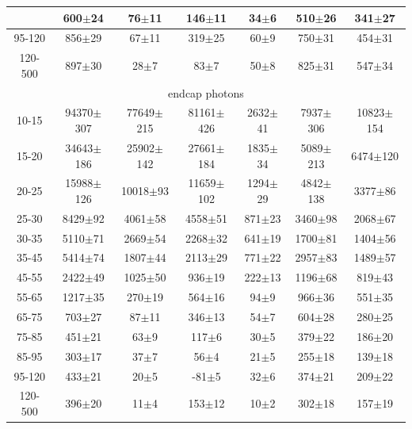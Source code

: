 \begin{table}[h]
\begin{center}
\begin{tabular}{|c|c|c|c|c|c|c|}
{85-95 & 600$\pm$24 & 76$\pm$11 & 146$\pm$11 & 34$\pm$6 & 510$\pm$26 & 341$\pm$27 \\ \hline 
95-120 & 856$\pm$29 & 67$\pm$11 & 319$\pm$25 & 60$\pm$9 & 750$\pm$31 & 454$\pm$31 \\ \hline 
120-500 & 897$\pm$30 & 28$\pm$7 & 83$\pm$7 & 50$\pm$8 & 825$\pm$31 & 547$\pm$34 \\ \hline 
\multicolumn{7}{|c|}{endcap photons}\\ \hline
10-15 & 94370$\pm$307 & 77649$\pm$215 & 81161$\pm$426 & 2632$\pm$41 & 7937$\pm$306 & 10823$\pm$154 \\ \hline 
15-20 & 34643$\pm$186 & 25902$\pm$142 & 27661$\pm$184 & 1835$\pm$34 & 5089$\pm$213 & 6474$\pm$120 \\ \hline 
20-25 & 15988$\pm$126 & 10018$\pm$93 & 11659$\pm$102 & 1294$\pm$29 & 4842$\pm$138 & 3377$\pm$86 \\ \hline 
25-30 & 8429$\pm$92 & 4061$\pm$58 & 4558$\pm$51 & 871$\pm$23 & 3460$\pm$98 & 2068$\pm$67 \\ \hline 
30-35 & 5110$\pm$71 & 2669$\pm$54 & 2268$\pm$32 & 641$\pm$19 & 1700$\pm$81 & 1404$\pm$56 \\ \hline 
35-45 & 5414$\pm$74 & 1807$\pm$44 & 2113$\pm$29 & 771$\pm$22 & 2957$\pm$83 & 1489$\pm$57 \\ \hline 
45-55 & 2422$\pm$49 & 1025$\pm$50 & 936$\pm$19 & 222$\pm$13 & 1196$\pm$68 & 819$\pm$43 \\ \hline 
55-65 & 1217$\pm$35 & 270$\pm$19 & 564$\pm$16 & 94$\pm$9 & 966$\pm$36 & 551$\pm$35 \\ \hline 
65-75 & 703$\pm$27 & 87$\pm$11 & 346$\pm$13 & 54$\pm$7 & 604$\pm$28 & 280$\pm$25 \\ \hline 
75-85 & 451$\pm$21 & 63$\pm$9 & 117$\pm$6 & 30$\pm$5 & 379$\pm$22 & 186$\pm$20 \\ \hline 
85-95 & 303$\pm$17 & 37$\pm$7 & 56$\pm$4 & 21$\pm$5 & 255$\pm$18 & 139$\pm$18 \\ \hline 
95-120 & 433$\pm$21 & 20$\pm$5 & -81$\pm$5 & 32$\pm$6 & 374$\pm$21 & 209$\pm$22 \\ \hline 
120-500 & 396$\pm$20 & 11$\pm$4 & 153$\pm$12 & 10$\pm$2 & 302$\pm$18 & 157$\pm$19 \\ \hline 
  \end{tabular}
  \label{tab:yields_Wg_to_munu_}
  \end{center}
\end{table}

\clearpage

